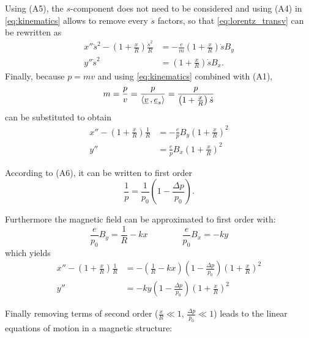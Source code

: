 Using (A5), the $s$-component does not need to be considered and using (A4) in \cref{eq:kinematics} allows to remove every $\ddot{s}$ factors, so that \cref{eq:lorentz_transv} can be rewritten as
\begin{equation}
\begin{aligned}
x'' \dot{s}^2 - \left(1+\frac{x}{R}\right)\frac{\dot{s}^2}{R}
&= -\frac{e}{m} \left(1+\frac{x}{R}\right)\dot{s}B_y \\
y'' \dot{s}^2 &=    \left(1+\frac{x}{R}\right)\dot{s}B_x.
\end{aligned}
\end{equation}
Finally, because $p=mv$ and using \cref{eq:kinematics} combined with (A1),
\begin{equation}
m = \frac{p}{v} = \frac{p}{\langle \underline{v} {\,,\,} \underline{e}_s \rangle} = \frac{p}{\left(1+\frac{x}{R}\right)\dot{s}}
\end{equation}
can be substituted to obtain
\begin{equation}
\begin{aligned}
x''-\left(1+\frac{x}{R}\right)\frac{1}{R} &= -\frac{e}{p} B_y\left(1+\frac{x}{R}\right)^2 \\
y'' &= \frac{e}{p} B_x\left(1+\frac{x}{R}\right)^2
\end{aligned}
\end{equation}

According to (A6), it can be written to first order
\begin{equation*}
\frac{1}{p} = \frac{1}{p_0} \left(1-\frac{\Delta p}{p_0}\right).
\end{equation*}

Furthermore the magnetic field can be approximated to first order with:
\begin{equation}
\frac{e}{p_0} B_y = \frac{1}{R}-kx \qquad\qquad \frac{e}{p_0} B_x = -ky
\end{equation}
which yields
\begin{equation}
\begin{aligned}
x''-\left(1+\frac{x}{R}\right)\frac{1}{R} &= -\left(\frac{1}{R}-kx\right)\left(1-\frac{\Delta p}{p_0}\right)\left(1+\frac{x}{R}\right)^2 \\
y'' &= -ky\left(1-\frac{\Delta p}{p_0}\right)\left(1+\frac{x}{R}\right)^2
\end{aligned}
\end{equation}

Finally removing terms of second order ($\frac{x}{R} \ll 1$, $\frac{\Delta p}{p_0} \ll 1$) leads to the linear equations of motion in a magnetic structure:

